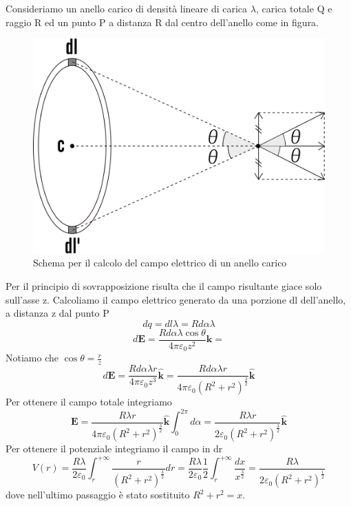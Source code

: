 \documentclass[
10pt, %
a4paper, %
oneside, %
headinclude,footinclude, %
BCOR5mm, %
]{scrartcl}
\begin{document}
\begin{esercizio}
Consideriamo un anello carico di densità lineare di carica $\lambda$, carica totale Q e raggio R ed un punto P a distanza R dal centro dell'anello come in figura.
\begin{figure}[h!]
	\centering
	\includegraphics[width=0.6\linewidth]{../images/anello}
	\caption{Schema per il calcolo del campo elettrico di un anello carico}
	\label{fig:anello}
\end{figure}
\FloatBarrier
Per il principio di sovrapposizione risulta che il campo risultante giace solo sull'asse z. Calcoliamo il campo elettrico generato da una porzione dl dell'anello, a distanza z dal punto P
\[dq = dl\lambda = R d\alpha \lambda\] 
\[d\mathbf{E} = \frac{ R d\alpha\lambda \cos\theta}{4\pi\varepsilon_0z^2}\hat{\mathbf{k}} = \]
Notiamo che $\cos\theta = \frac{r}{z}$
\[d\mathbf{E} = \frac{ R d\alpha\lambda r }{4\pi\varepsilon_0 z^3}\hat{\mathbf{k}} = \frac{ R d\alpha\lambda r }{4\pi\varepsilon_0 (R^2+r^2)^{\frac{3}{2}}}\hat{\mathbf{k}}\]
Per ottenere il campo totale integriamo 
\[\mathbf{E} = \frac{ R \lambda r }{4\pi\varepsilon_0 (R^2+r^2)^{\frac{3}{2}}}\hat{\mathbf{k}}\int_{0}^{2\pi}d\alpha= \frac{ R \lambda r }{2\varepsilon_0 (R^2+r^2)^{\frac{3}{2}}}\hat{\mathbf{k}} \]
Per ottenere il potenziale integriamo il campo in dr
\[V(r) = \frac{R \lambda}{2\varepsilon_0}\int_{r}^{+\infty}\frac{  r }{ (R^2+r^2)^{\frac{3}{2}}} dr= \frac{R \lambda}{2\varepsilon_0}\frac{1}{2}\int_{r}^{+\infty}\frac{ dx }{ x^{\frac{3}{2}}} = \frac{ R \lambda }{2\varepsilon_0 (R^2+r^2)^{\frac{1}{2}}}\]
dove nell'ultimo passaggio è stato sostituito \(R^2+r^2 = x\).
\end{esercizio}
\end{document}
